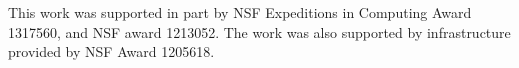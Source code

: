 This work was supported in part  by NSF Expeditions in Computing Award 1317560, and NSF award 1213052. The work was also supported by infrastructure provided by NSF Award 1205618.
